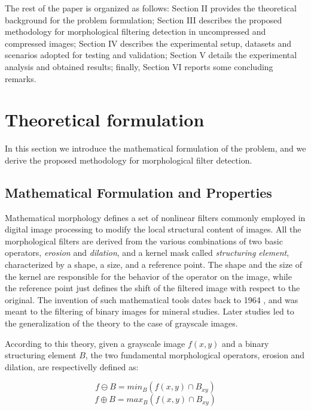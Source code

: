 \documentclass[review]{elsarticle}
\begin{document}
The rest of the paper is organized as follows: Section II provides the theoretical background for the problem formulation; Section III describes the proposed methodology for morphological filtering detection in uncompressed and compressed images; Section IV describes the experimental setup, datasets and scenarios adopted for testing and validation; Section V details the experimental analysis and  obtained results; finally, Section VI reports some concluding remarks.   

\section{Theoretical formulation}
\label{sec:method}
In this section we introduce the mathematical formulation of the problem, and we derive the proposed methodology for morphological filter detection. 

\subsection{Mathematical Formulation and Properties}
Mathematical morphology defines a set of nonlinear filters commonly employed in digital image processing to modify the local structural content of images. All the morphological filters are derived from the various combinations of two basic operators, \textit{erosion} and \textit{dilation}, and a kernel mask called \textit{structuring element}, characterized by a shape, a size, and a reference point. The shape and the size of the kernel are responsible for the behavior of the operator on the image, while the reference point just defines the shift of the filtered image with respect to the original. The invention of such mathematical tools dates back to 1964 \cite{haas1967morphologie}, and was meant to the filtering of binary images for mineral studies. Later studies \cite{nakagawa1977note} led to the generalization of the theory to the case of grayscale images.

According to this theory, given a grayscale image $f(x,y)$ and a binary structuring element $B$, the two fundamental morphological operators, erosion and dilation, are respectivelly defined as:

\begin{equation} \label{eq:erode}
f \ominus B = min_B(f(x,y) \cap B_{xy})
\end{equation}
\begin{equation} \label{eq:dilate}
f \oplus B = max_B(f(x,y) \cap B_{xy})
\end{equation}
\end{document}
